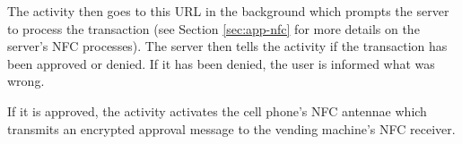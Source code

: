 The activity then goes to this URL in the background which prompts the server to
process the transaction (see Section \ref{sec:app-nfc} for more details on the
server's NFC processes). The server then tells the activity if the transaction
has been approved or denied. If it has been denied, the user is informed what was wrong. 

If it is approved, the activity activates the cell phone's NFC antennae which
transmits an encrypted approval message to the vending machine's NFC receiver. 
